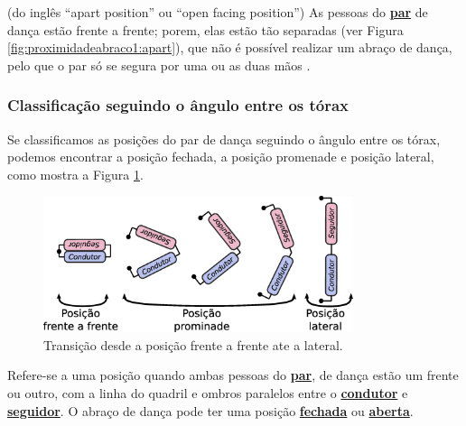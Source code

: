 \begin{definition}
\label{def:apart-position} (do inglês ``apart position'' ou ``open facing position'') 
As pessoas do \hyperref[def:Par]{\textbf{par}} de dança estão frente a frente;
porem, elas estão tão separadas (ver Figura \ref{fig:proximidadeabraco1:apart}), 
que não é possível realizar um abraço de dança, 
pelo que o par só se segura por uma ou as duas mãos \cite{fletsher2015improve} \cite[pp. 14]{BallroomDancing1992}.
\end{definition}

\subsubsection{Classificação seguindo o ângulo entre os tórax}
Se classificamos as posições do par de dança seguindo o ângulo entre os tórax,
podemos encontrar a posição fechada, 
a posição promenade e posição lateral, como mostra a Figura \ref{fig:desenhando}.
\begin{figure}[!ht]
     \centering
\includegraphics[width=0.81\textwidth]{chapters/cap-normas/desenhando.eps}
\caption{Transição desde a posição frente a frente ate a lateral.}
\label{fig:desenhando}
\end{figure}


\begin{definition}
\label{def:frente-frente-position} 
Refere-se a uma posição quando ambas pessoas do \hyperref[def:Par]{\textbf{par}}, 
de dança estão um frente ou outro,
com a linha do quadril e ombros paralelos entre o 
\hyperref[def:Condutor]{\textbf{condutor}} e
\hyperref[def:Seguidor]{\textbf{seguidor}}.
O abraço de dança pode ter uma posição \hyperref[def:closed-position]{\textbf{fechada}} 
ou \hyperref[def:open-position]{\textbf{aberta}}.
\end{definition}



